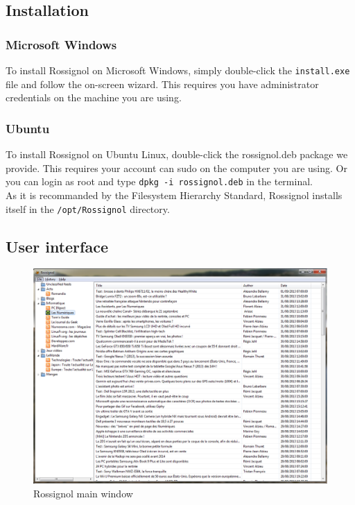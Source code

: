 \documentclass[11pt]{article} %
\begin{document}
\subsection{Installation}
\subsubsection{Microsoft Windows}
To install Rossignol on Microsoft Windows, simply double-click the 
\texttt{install.exe}
file and follow the on-screen wizard. This requires you have administrator 
credentials on the machine you are using. 

\subsubsection{Ubuntu}
To install Rossignol on Ubuntu Linux, double-click the rossignol.deb package 
we provide. This requires your account can sudo on the computer you are using. 
Or you can login as root and type \texttt{dpkg -i rossignol.deb} in the terminal. 
\\
As it is recommanded by the Filesystem Hierarchy Standard, Rossignol installs 
itself in the \texttt{/opt/Rossignol} directory. 

\subsection{User interface}

\begin{figure}[h]
\includegraphics[width=15cm]{img/screen_rossignol.png}
\caption{Rossignol main window}
\end{figure}
\end{document}
